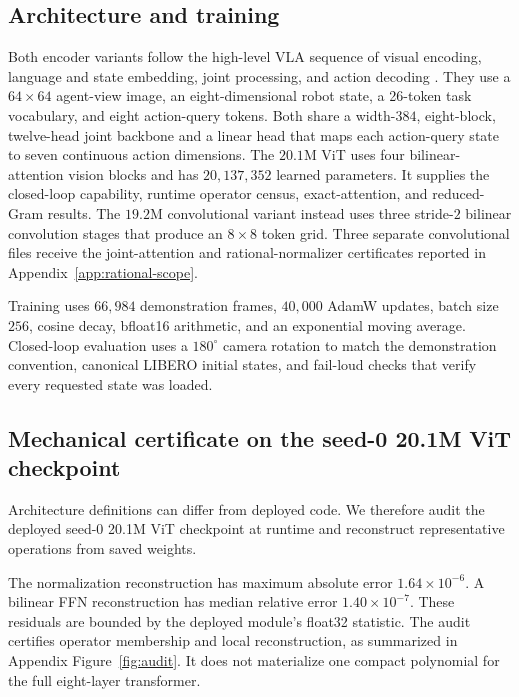 \documentclass{article}
\begin{document}
\subsection{Architecture and training}

Both encoder variants follow the high-level VLA sequence of visual encoding, language and state
embedding, joint processing, and action decoding \cite{openvla}. They use a $64\times64$
agent-view image, an eight-dimensional robot state, a 26-token task vocabulary, and eight
action-query tokens. Both share a width-$384$, eight-block, twelve-head joint backbone and a
linear head that maps each action-query state to seven continuous action dimensions. The
$20.1$M ViT uses four bilinear-attention vision blocks and has $20{,}137{,}352$ learned
parameters. It supplies the closed-loop capability, runtime operator census, exact-attention,
and reduced-Gram results. The $19.2$M convolutional variant instead uses three stride-$2$
bilinear convolution stages that produce an $8\times8$ token grid. Three separate convolutional
files receive the joint-attention and rational-normalizer certificates reported in
Appendix~\ref{app:rational-scope}.

Training uses $66{,}984$ demonstration frames, $40{,}000$ AdamW updates, batch size $256$,
cosine decay, bfloat16 arithmetic, and an exponential moving average. Closed-loop evaluation
uses a $180^\circ$ camera rotation to match the demonstration convention, canonical LIBERO
initial states, and fail-loud checks that verify every requested state was loaded.

\subsection{Mechanical certificate on the seed-0 20.1M ViT checkpoint}

Architecture definitions can differ from deployed code. We therefore audit the deployed seed-$0$
20.1M ViT checkpoint at runtime and reconstruct representative operations from saved weights.

The normalization reconstruction has maximum absolute error $1.64\times10^{-6}$. A bilinear
FFN reconstruction has median relative error $1.40\times10^{-7}$. These residuals are bounded
by the deployed module's float32 statistic. The audit certifies operator membership and local
reconstruction, as summarized in Appendix Figure~\ref{fig:audit}. It does not materialize one
compact polynomial for the full eight-layer transformer.

\end{document}
